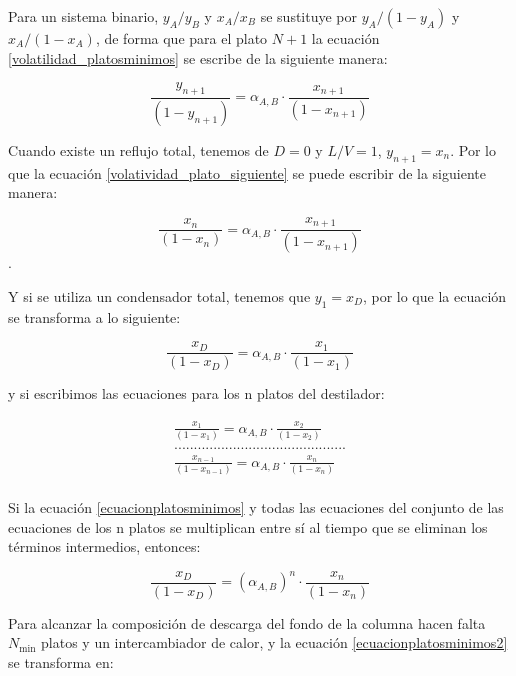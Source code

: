 \documentclass[11pt]{book}
\begin{document}
Para un sistema binario, $y_A/y_B$ y $x_A/x_B$ se sustituye por $y_A/(1-y_A)$ y $x_A/(1-x_A)$, de forma que para el plato $N+1$ la ecuación \ref{volatilidad_platosminimos} se escribe de la siguiente manera:

\begin{equation}
    \label{volatividad_plato_siguiente}
    \frac{y_{n+1}}{(1-y_{n+1})} = \alpha_{A,B} \cdot \frac{x_{n+1}}{(1-x_{n+1})}
\end{equation}

Cuando existe un reflujo total, tenemos de $D = 0$ y $L/V = 1$, $y_{n+1} = x_{n}$. Por lo que la ecuación \ref{volatividad_plato_siguiente} se puede escribir de la siguiente manera:

\begin{equation}
    \frac{x_{n}}{(1-x_{n})} = \alpha_{A,B} \cdot \frac{x_{n+1}}{(1-x_{n+1})}
\end{equation}.

Y si se utiliza un condensador total, tenemos que $y_1 = x_D$, por lo que la ecuación se transforma a lo siguiente:

\begin{equation}
    \label{ecuacionplatosminimos}
    \frac{x_{D}}{(1-x_{D})} = \alpha_{A,B} \cdot \frac{x_{1}}{(1-x_{1})}    
\end{equation}

y si escribimos las ecuaciones para los n platos del destilador:

\begin{align*}
    \frac{x_{1}}{(1-x_{1})} = \alpha_{A,B} \cdot \frac{x_{2}}{(1-x_{2})} \\
    ............................................ \\
    \frac{x_{n-1}}{(1-x_{n-1})} = \alpha_{A,B} \cdot \frac{x_{n}}{(1-x_{n})} \\
\end{align*}

Si la ecuación \ref{ecuacionplatosminimos} y todas las ecuaciones del conjunto de las ecuaciones de los n platos se multiplican entre sí al tiempo que se eliminan los términos intermedios, entonces:

\begin{equation}
    \label{ecuacionplatosminimos2}
    \frac{x_{D}}{(1-x_{D})} = (\alpha_{A,B})^{n} \cdot \frac{x_{n}}{(1-x_{n})}
\end{equation}

Para alcanzar la composición de descarga del fondo de la columna hacen falta $N_{\textrm{min}}$ platos y un intercambiador de calor, y la ecuación \ref{ecuacionplatosminimos2} se transforma en:
\end{document}

